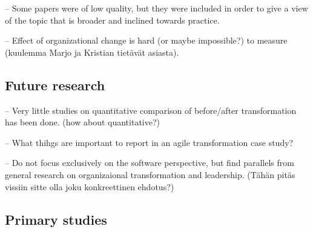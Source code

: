 \documentclass[lnbip]{svmultln}
\begin{document}
-- Some papers were of low quality, but they were included in order to give a
view of the topic that is broader and inclined towards practice.

-- Effect of organizational change is hard (or maybe impossible?) to measure
(kuulemma Marjo ja Kristian tietävät asiasta).

\subsection{Future research}

-- Very little studies on quantitative comparison of before/after transformation
has been done. (how about quantitative?)

-- What thihgs are important to report in an agile transformation case study?

-- Do not focus exclusively on the software perspective, but find parallels from
general research on organizaional transformation and leadership. (Tähän pitäs
vissiin sitte olla joku konkreettinen ehdotus?)







\subsection*{Primary studies}

\small
\end{document}
